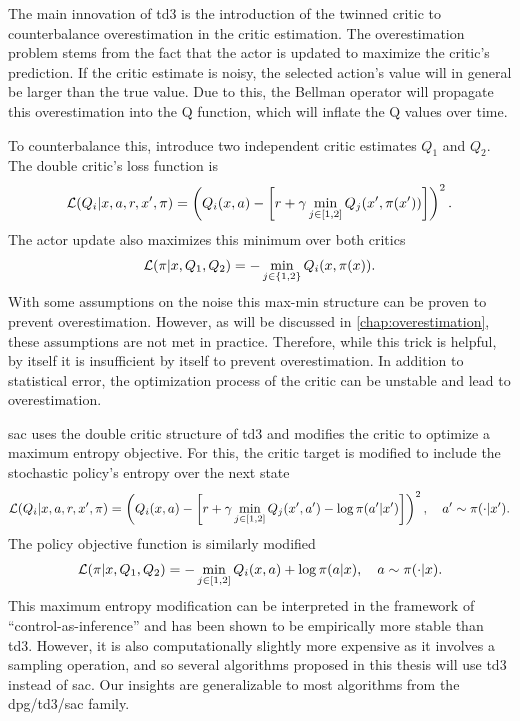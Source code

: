 The main innovation of \ac{td3} is the introduction of the twinned critic to counterbalance overestimation in the critic estimation.
The overestimation problem stems from the fact that the actor is updated to maximize the critic's prediction.
If the critic estimate is noisy, the selected action's value will in general be larger than the true value.
Due to this, the Bellman operator will propagate this overestimation into the Q function, which will inflate the Q values over time.

To counterbalance this, \textcite{fujimoto2018addressing} introduce two independent critic estimates $Q_1$ and $Q_2$.
The double critic's loss function is
\begin{align}
    \mathcal{L}(Q_i| x, a, r, x', \pi) = \left(Q_i(x,a) - \left[r + \gamma \min_{j \in [1,2]}Q_j(x', \pi(x'))\right]\right)^2.
\end{align}
The actor update also maximizes this minimum over both critics
\begin{align}
    \mathcal{L}(\pi| x, Q_1, Q_2) = - \min_{j \in \{1,2\}} Q_i(x, \pi(x)).
\end{align}
With some assumptions on the noise this max-min structure can be proven to prevent overestimation.
However, as will be discussed in \autoref{chap:overestimation}, these assumptions are not met in practice.
Therefore, while this trick is helpful, by itself it is insufficient by itself to prevent overestimation.
In addition to statistical error, the optimization process of the critic can be unstable and lead to overestimation.

\ac{sac} uses the double critic structure of \ac{td3} and modifies the critic to optimize a maximum entropy objective.
For this, the critic target is modified to include the stochastic policy's entropy over the next state
\begin{align}
    \mathcal{L}(Q_i| x, a, r, x', \pi) = \left(Q_i(x,a) - \left[r + \gamma \min_{j \in [1,2]}Q_j(x', a') - \log \pi(a'|x')\right]\right)^2, \quad a'\sim\pi(\cdot|x').
\end{align}
The policy objective function is similarly modified
\begin{align}
    \mathcal{L}(\pi| x, Q_1, Q_2) = - \min_{j \in [1,2]} Q_i(x, a) + \log \pi(a|x), \quad a\sim\pi(\cdot|x).
\end{align}
This maximum entropy modification can be interpreted in the framework of ``control-as-inference'' \parencite{levine2018reinforcement} and has been shown to be empirically more stable than \ac{td3}.
However, it is also computationally slightly more expensive as it involves a sampling operation, and so several algorithms proposed in this thesis will use \ac{td3} instead of \ac{sac}.
Our insights are generalizable to most algorithms from the \ac{dpg}/\ac{td3}/\ac{sac} family.

